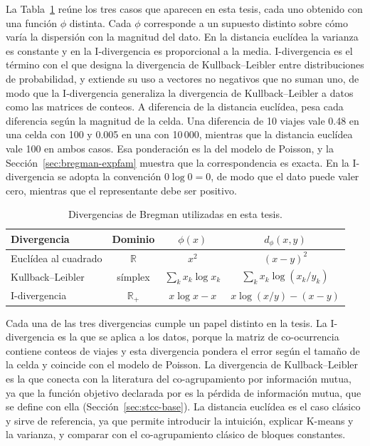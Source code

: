 La Tabla~\ref{tab:bregman} reúne los tres casos que aparecen en esta tesis, cada
uno obtenido con una función $\phi$ distinta. Cada $\phi$ corresponde a un
supuesto distinto sobre cómo varía la dispersión con la magnitud del dato. En la
distancia euclídea la varianza es constante y en la I-divergencia es
proporcional a la media. I-divergencia es el término con el que
\citet{Csiszar1975} designa la divergencia de Kullback--Leibler entre
distribuciones de probabilidad, y \citet{Csiszar1991} extiende su uso a vectores
no negativos que no suman uno, de modo que la I-divergencia generaliza la
divergencia de Kullback--Leibler a datos como las matrices de conteos. A
diferencia de la distancia euclídea, pesa cada diferencia según la magnitud de la
celda. Una diferencia de 10 viajes vale 0.48 en una celda con 100 y 0.005 en una
con 10\,000, mientras que la distancia euclídea vale 100 en ambos casos. Esa
ponderación es la del modelo de Poisson, y la
Sección~\ref{sec:bregman-expfam} muestra que la correspondencia es exacta. En la
I-divergencia se adopta la convención $0 \log 0 = 0$, de modo que el dato puede
valer cero, mientras que el representante debe ser positivo.

\begin{table}[ht]
  \centering
  {\footnotesize
  \renewcommand{\arraystretch}{1.4}
  \begin{tabular}{@{}lccc@{}}
    \toprule
    \textbf{Divergencia} & \textbf{Dominio} & $\phi(x)$ & $d_\phi(x,y)$ \\
    \midrule
    Euclídea al cuadrado & $\mathbb{R}$ & $x^2$ & $(x-y)^2$ \\
    \midrule
    Kullback--Leibler & símplex & $\sum_k x_k \log x_k$ & $\sum_k x_k \log (x_k/y_k)$ \\
    \midrule
    I-divergencia & $\mathbb{R}_{+}$ & $x \log x - x$ & $x \log (x/y) - (x - y)$ \\
    \bottomrule
  \end{tabular}
  }
  \caption{Divergencias de Bregman utilizadas en esta tesis.}
  \label{tab:bregman}
\end{table}

Cada una de las tres divergencias cumple un papel distinto en la tesis. La
I-divergencia es la que se aplica a los datos, porque la matriz de co-ocurrencia
contiene conteos de viajes y esta divergencia pondera el error según el tamaño
de la celda y coincide con el modelo de Poisson. La divergencia de
Kullback--Leibler es la que conecta con la literatura del co-agrupamiento por
información mutua, ya que la función objetivo declarada por \citet{Liu2021} es la
pérdida de información mutua, que se define con ella
(Sección~\ref{sec:stcc-base}). La distancia euclídea es el caso clásico y sirve
de referencia, ya que permite introducir la intuición, explicar K-means y la
varianza, y comparar con el co-agrupamiento clásico de bloques constantes.


